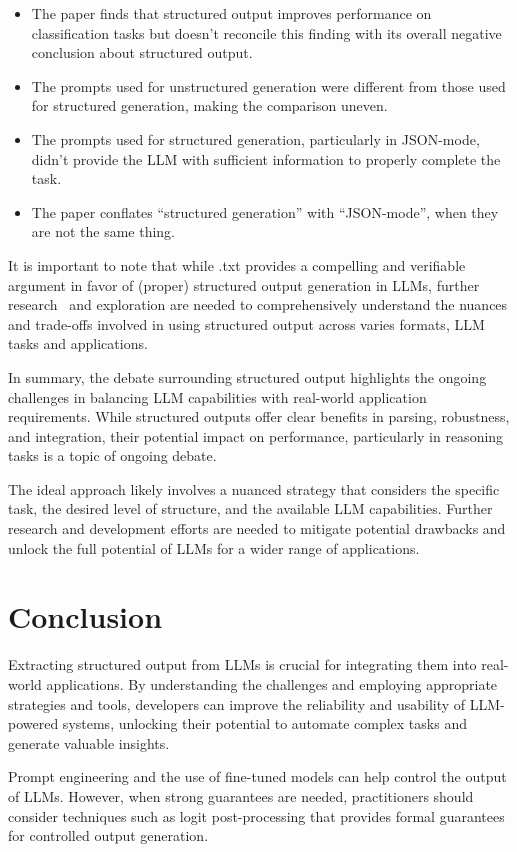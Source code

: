 \begin{itemize}
    \item The paper finds that structured output improves performance on classification tasks but doesn't reconcile this finding with its overall negative conclusion about structured output.
    \item The prompts used for unstructured generation were different from those used for structured generation, making the comparison uneven.
    \item The prompts used for structured generation, particularly in JSON-mode, didn't provide the LLM with sufficient information to properly complete the task.
    \item The paper conflates ``structured generation'' with ``JSON-mode'', when they are not the same thing.
\end{itemize}

It is important to note that while .txt provides a compelling and verifiable argument in favor of (proper) structured output generation in LLMs, further research~  and exploration are needed to comprehensively understand the nuances and trade-offs involved in using structured output across varies formats, LLM tasks and applications.

In summary, the debate surrounding structured output highlights the ongoing challenges in balancing LLM capabilities with real-world application requirements. While structured outputs offer clear benefits in parsing, robustness, and integration, their potential impact on performance, particularly in reasoning tasks is a topic of ongoing debate.

The ideal approach likely involves a nuanced strategy that considers the specific task, the desired level of structure, and the available LLM capabilities. Further research and development efforts are needed to mitigate potential drawbacks and unlock the full potential of LLMs for a wider range of applications.

\section{Conclusion}

Extracting structured output from LLMs is crucial for integrating them into real-world applications. By understanding the challenges and employing appropriate strategies and tools, developers can improve the reliability and usability of LLM-powered systems, unlocking their potential to automate complex tasks and generate valuable insights.

Prompt engineering and the use of fine-tuned models can help control the output of LLMs. However, when strong guarantees are needed, practitioners should consider techniques such as logit post-processing that provides formal guarantees for controlled output generation.

